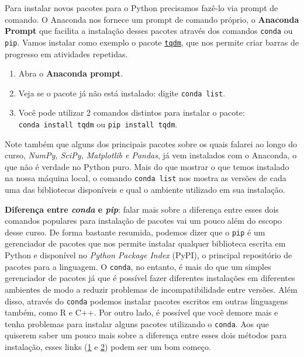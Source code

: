 \documentclass[
  brazilian,
  letterpaper,
  DIV=11,
  numbers=noendperiod]{scrreprt}
\providecommand{\tightlist}{%
  \setlength{\itemsep}{0pt}\setlength{\parskip}{0pt}}
\begin{document}
Para instalar novos pacotes para o Python precisamos fazê-lo via prompt
de comando. O Anaconda nos fornece um prompt de comando próprio, o
\textbf{Anaconda Prompt} que facilita a instalação desses pacotes
através dos comandos \texttt{conda} ou \texttt{pip}. Vamos instalar como
exemplo o pacote
\href{https://github.com/tqdm/tqdm\#installation}{\texttt{tqdm}}, que
nos permite criar barras de progresso em atividades repetidas.

\begin{enumerate}
\def\labelenumi{\arabic{enumi}.}
\tightlist
\item
  Abra o \textbf{Anaconda prompt}.
\item
  Veja se o pacote já não está instalado: digite \texttt{conda\ list}.
\item
  Você pode utilizar 2 comandos distintos para instalar o pacote:
  \texttt{conda\ install\ tqdm} ou \texttt{pip\ install\ tqdm}.
\end{enumerate}

Note também que alguns dos principais pacotes sobre os quais falarei ao
longo do curso, \emph{NumPy, SciPy, Matplotlib e Pandas}, já vem
instalados com o Anaconda, o que não é verdade no Python puro. Mais do
que mostrar o que temos instalado na nossa máquina local, o comando
\texttt{conda\ list} nos mostra as versões de cada uma das bibliotecas
disponíveis e qual o ambiente utilizado em sua instalação.

\textbf{Diferença entre \emph{conda} e \emph{pip}}: falar mais sobre a
diferença entre esses dois comandos populares para instalação de pacotes
vai um pouco além do escopo desse curso. De forma bastante resumida,
podemos dizer que o \texttt{pip} é um gerenciador de pacotes que nos
permite instalar qualquer biblioteca escrita em Python e disponível no
\emph{Python Package Index} (PyPI), o principal repositório de pacotes
para a linguagem. O \texttt{conda}, no entanto, é mais do que um simples
gerenciador de pacotes já que é possível fazer diferentes instalações em
diferentes ambientes de modo a reduzir problemas de incompatibilidade
entre versões. Além disso, através do \texttt{conda} podemos instalar
pacotes escritos em outras linguagens também, como R e C++. Por outro
lado, é possível que você demore mais e tenha problemas para instalar
alguns pacotes utilizando o \texttt{conda}. Aos que quiserem saber um
pouco mais sobre a diferença entre esses dois métodos para instalação,
esses links
(\href{https://www.anaconda.com/blog/understanding-conda-and-pip}{1} e
\href{https://pythonspeed.com/articles/conda-vs-pip/}{2}) podem ser um
bom começo.
\end{document}
